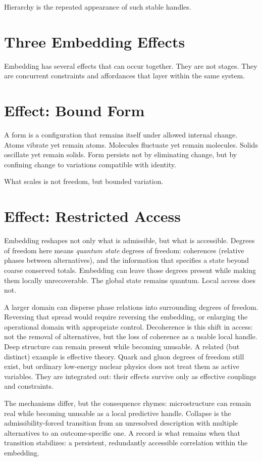 \documentclass[11pt,twoside,openright]{book}
\begin{document}
Hierarchy is the repeated appearance of such stable handles.

\section*{Three Embedding Effects}

Embedding has several effects that can occur together. They are not stages. They are concurrent constraints and affordances that layer within the same system.

\section*{Effect: Bound Form}

A form is a configuration that remains itself under allowed internal change. Atoms vibrate yet remain atoms. Molecules fluctuate yet remain molecules. Solids oscillate yet remain solids. Form persists not by eliminating change, but by confining change to variations compatible with identity.

What scales is not freedom, but bounded variation.

\section*{Effect: Restricted Access}

Embedding reshapes not only what is admissible, but what is accessible. Degrees of freedom here means \emph{quantum state} degrees of freedom: coherences (relative phases between alternatives), and the information that specifies a state beyond coarse conserved totals. Embedding can leave those degrees present while making them locally unrecoverable. The global state remains quantum. Local access does not.

A larger domain can disperse phase relations into surrounding degrees of freedom. Reversing that spread would require reversing the embedding, or enlarging the operational domain with appropriate control. Decoherence is this shift in access: not the removal of alternatives, but the loss of coherence as a usable local handle. Deep structure can remain present while becoming unusable. A related (but distinct) example is effective theory. Quark and gluon degrees of freedom still exist, but ordinary low-energy nuclear physics does not treat them as active variables. They are integrated out: their effects survive only as effective couplings and constraints.

The mechanisms differ, but the consequence rhymes: microstructure can remain real while becoming unusable as a local predictive handle. Collapse is the admissibility-forced transition from an unresolved description with multiple alternatives to an outcome-specific one. A record is what remains when that transition stabilizes: a persistent, redundantly accessible correlation within the embedding.
\end{document}
